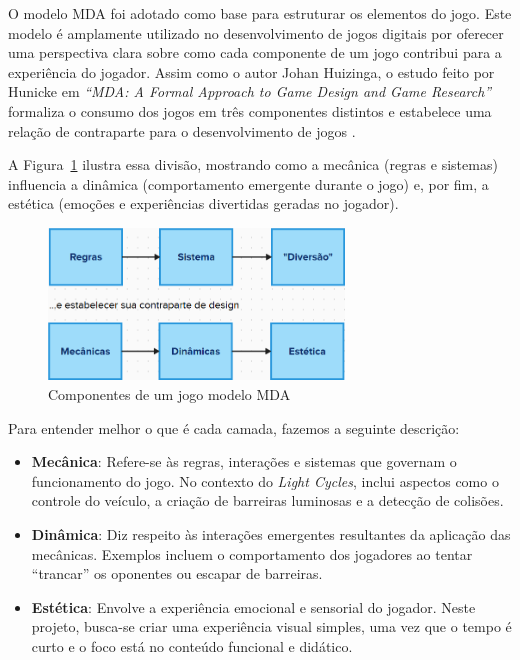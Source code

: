 O modelo MDA foi adotado como base para estruturar os elementos do jogo. Este modelo é amplamente utilizado no desenvolvimento de jogos digitais por oferecer uma perspectiva clara sobre como cada componente de um jogo contribui para a experiência do jogador. Assim como o autor Johan Huizinga, o estudo feito por Hunicke em \textit{“MDA: A Formal Approach to Game Design and Game Research”} formaliza o consumo dos jogos em três componentes distintos e estabelece uma relação de contraparte para o desenvolvimento de jogos \cite{hunicke2004}.

A Figura~\ref{fig:mda-comp} ilustra essa divisão, mostrando como a mecânica (regras e sistemas) influencia a dinâmica (comportamento emergente durante o jogo) e, por fim, a estética (emoções e experiências divertidas geradas no jogador).

\begin{figure}[htbp]
    \centering
    \caption{Componentes de um jogo modelo MDA}
    \label{fig:mda-comp}
    \includegraphics[width=0.7\textwidth]{figuras/adaptado_mda.png}
\end{figure}

Para entender melhor o que é cada camada, fazemos a seguinte descrição:

\begin{itemize}
    \item \textbf{Mecânica}: Refere-se às regras, interações e sistemas que governam o funcionamento do jogo. No contexto do \textit{Light Cycles}, inclui aspectos como o controle do veículo, a criação de barreiras luminosas e a detecção de colisões.
    
    \item \textbf{Dinâmica}: Diz respeito às interações emergentes resultantes da aplicação das mecânicas. Exemplos incluem o comportamento dos jogadores ao tentar ``trancar'' os oponentes ou escapar de barreiras.
    
    \item \textbf{Estética}: Envolve a experiência emocional e sensorial do jogador. Neste projeto, busca-se criar uma experiência visual simples, uma vez que o tempo é curto e o foco está no conteúdo funcional e didático.
\end{itemize}

